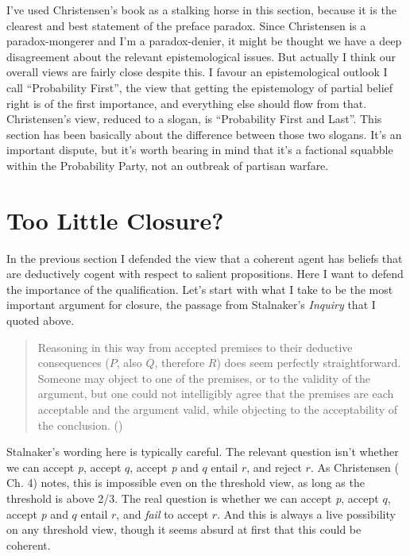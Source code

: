 \documentclass[
  11pt,
  letterpaper,
  DIV=11,
  numbers=noendperiod,
  oneside]{scrartcl}
\begin{document}
I've used Christensen's book as a stalking horse in this section,
because it is the clearest and best statement of the preface paradox.
Since Christensen is a paradox-mongerer and I'm a paradox-denier, it
might be thought we have a deep disagreement about the relevant
epistemological issues. But actually I think our overall views are
fairly close despite this. I favour an epistemological outlook I call
``Probability First'', the view that getting the epistemology of partial
belief right is of the first importance, and everything else should flow
from that. Christensen's view, reduced to a slogan, is ``Probability
First and Last''. This section has been basically about the difference
between those two slogans. It's an important dispute, but it's worth
bearing in mind that it's a factional squabble within the Probability
Party, not an outbreak of partisan warfare.

\section{Too Little Closure?}\label{too-little-closure}

In the previous section I defended the view that a coherent agent has
beliefs that are deductively cogent with respect to salient
propositions. Here I want to defend the importance of the qualification.
Let's start with what I take to be the most important argument for
closure, the passage from Stalnaker's \emph{Inquiry} that I quoted
above.

\begin{quote}
Reasoning in this way from accepted premises to their deductive
consequences (\(P\), also \(Q\), therefore \(R\)) does seem perfectly
straightforward. Someone may object to one of the premises, or to the
validity of the argument, but one could not intelligibly agree that the
premises are each acceptable and the argument valid, while objecting to
the acceptability of the conclusion.
()
\end{quote}

Stalnaker's wording here is typically careful. The relevant question
isn't whether we can accept \emph{p}, accept \(q\), accept \emph{p} and
\(q\) entail \(r\), and reject \(r\). As Christensen
( Ch. 4) notes, this is impossible
even on the threshold view, as long as the threshold is above 2/3. The
real question is whether we can accept \emph{p}, accept \(q\), accept
\emph{p} and \(q\) entail \(r\), and \emph{fail} to accept \(r\). And
this is always a live possibility on any threshold view, though it seems
absurd at first that this could be coherent.
\end{document}
